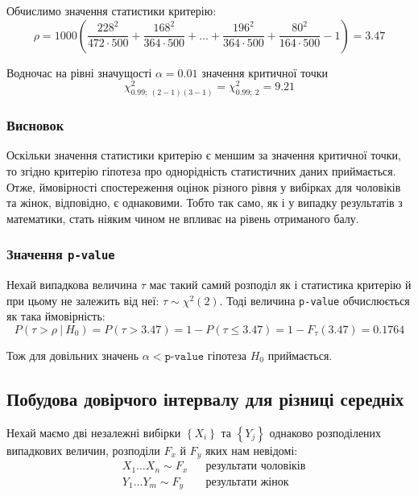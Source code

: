 Обчислимо значення статистики критерію:
\begin{equation*}
    \rho = 1000\left( \frac{228^2}{472\cdot 500}+\frac{168^2}{364\cdot 500} + \ldots + 
    \frac{196^2}{364\cdot 500}+\frac{80^2}{164\cdot 500} - 1 \right) = 3.47
\end{equation*}

Водночас на рівні значущості $\alpha=0.01$ значення критичної точки
\begin{equation*} 
    \chi^2_{0.99;\ (2-1)(3-1)}=\chi^2_{0.99;\ 2}=9.21
\end{equation*}

\subsubsection*{Висновок}

Оскільки значення статистики критерію є меншим за значення критичної точки, то згідно критерію гіпотеза 
про однорідність статистичних даних приймається. Отже, ймовірності спостереження оцінок різного рівня у 
вибірках для чоловіків та жінок, відповідно, є однаковими. Тобто так само, як і у випадку результатів з 
математики, стать ніяким чином не впливає на рівень отриманого балу.

\subsubsection*{Значення \texttt{p-value}}

Нехай випадкова величина $\tau$ має такий самий розподіл як і статистика критерію й при цьому не залежить 
від неї: $\tau\sim\chi^2(2)$. Тоді величина \texttt{p-value} обчислюється як така ймовірність:
\[ P(\tau>\rho\ |\ H_0)=P(\tau>3.47)=1-P(\tau\leqslant3.47)=1-F_{\tau}(3.47)=0.1764 \]

Тож для довільних значень $\alpha<\texttt{p-value}$ гіпотеза $H_0$ приймається.

\subsection*{Побудова довірчого інтервалу для різниці середніх}

Нехай маємо дві незалежні вибірки $\left\{ X_i \right\}$ та $\left\{ Y_j \right\}$ 
однаково розподілених випадкових величин, розподіли $F_x$ й $F_y$ яких нам невідомі:
\begin{align*}
    &X_1 \ldots X_n\sim F_x && \text{результати чоловіків} \\
    &Y_1 \ldots Y_m\sim F_y && \text{результати жінок}
\end{align*}

